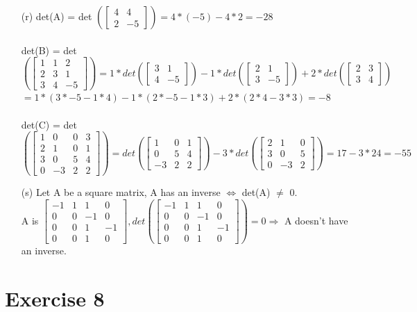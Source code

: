 \documentclass[a4paper]{article}
\begin{document}
\begin{itemize}
\item[(r)] det(A) = det
$
(
\begin{bmatrix} 
4 & 4\\
2 & -5 
\end{bmatrix}
) = 4*(-5) - 4*2 = -28
$\\\\
det(B) = det
$
(
\begin{bmatrix} 
1 & 1 & 2\\
2 & 3 & 1\\
3 & 4 & -5
\end{bmatrix}
) = 
1 * det(
\begin{bmatrix} 
3 & 1\\
4 & -5 
\end{bmatrix}
)
-1* det(
\begin{bmatrix} 
2 & 1\\
3 & -5 
\end{bmatrix}
) + 
2 * det(
\begin{bmatrix} 
2 & 3\\
3 & 4 
\end{bmatrix}
)
$\\
$=
1 *(3 * −5 − 1 * 4) − 1 *(2 * −5 − 1 * 3) + 2 * (2 * 4 − 3 * 3) = -8
$\\\\
det(C) = det
$
(
\begin{bmatrix} 
1 & 0 & 0 & 3\\
2 & 1 & 0 & 1\\
3 & 0 & 5 & 4\\
0 & -3 & 2 & 2
\end{bmatrix}
)
= 
det(
\begin{bmatrix} 
1 & 0 & 1\\
0 & 5 & 4\\
-3 & 2 & 2
\end{bmatrix}
)
-3 * det(
\begin{bmatrix} 
2 & 1 & 0 \\
3 & 0 & 5 \\
0 & -3 & 2
\end{bmatrix}
) = 17 - 3* 24 = -55
$
\item[(s)] Let A be a square matrix, A has an inverse $\Leftrightarrow$ det(A) $\neq$ 0.\\
A is
$
\begin{bmatrix} 
-1 & 1 & 1 & 0 \\
0 & 0 & -1 & 0 \\
0 & 0 & 1 & -1 \\
0 & 0 & 1 & 0 
\end{bmatrix},
det(
\begin{bmatrix} 
-1 & 1 & 1 & 0 \\
0 & 0 & -1 & 0 \\
0 & 0 & 1 & -1 \\
0 & 0 & 1 & 0 
\end{bmatrix}
)= 0 \Rightarrow
$ A doesn't have an inverse.
\end{itemize}

\section*{Exercise 8}
\end{document}
